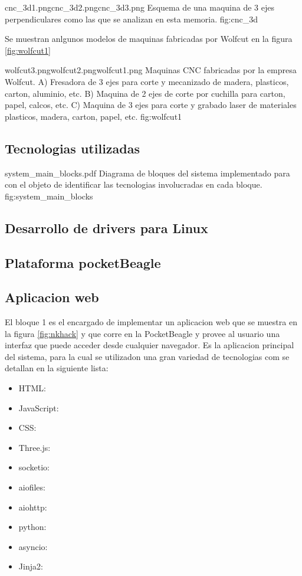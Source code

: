             {cnc_3d1.png}{cnc_3d2.png}{cnc_3d3.png}
            {Esquema de una maquina de 3 ejes perpendiculares como las que se analizan en esta memoria.}
            {fig:cnc_3d}

Se muestran anlgunos modelos de maquinas fabricadas por Wolfcut en la figura \ref{fig:wolfcut1}

            {wolfcut3.png}{wolfcut2.png}{wolfcut1.png}
            {Maquinas CNC fabricadas por la empresa Wolfcut. A) Fresadora de 3 ejes para corte y mecanizado de madera, plasticos, carton, aluminio, etc. B) Maquina de 2 ejes de corte por cuchilla para carton, papel, calcos, etc. C) Maquina de 3 ejes para corte y grabado laser de materiales plasticos, madera, carton, papel, etc.}
            {fig:wolfcut1}


\subsection{Tecnologias utilizadas}

         {system_main_blocks.pdf}
         {Diagrama de bloques del sistema implementado para con el objeto de identificar las tecnologias involucradas en cada bloque.}
         {fig:system_main_blocks}


\subsection{Desarrollo de drivers para Linux}


\subsection{Plataforma pocketBeagle}
\subsection{Aplicacion web}
El bloque 1 es el encargado de implementar un aplicacion web que se muestra en la figura \ref{fig:nkhack} y que corre en la PocketBeagle y provee al usuario una interfaz que puede acceder desde cualquier navegador.
   Es la aplicacion principal del sistema, para la cual se utilizadon una gran variedad de tecnologias com se detallan en la siguiente lista:
   \begin{itemize}
      \item{HTML:}
      \item{JavaScript:}
      \item{CSS:}
      \item{Three.js:}
      \item{socketio:}
      \item{aiofiles:}
      \item{aiohttp:}
      \item{python:}
      \item{asyncio:}
      \item{Jinja2:}
   \end{itemize}

